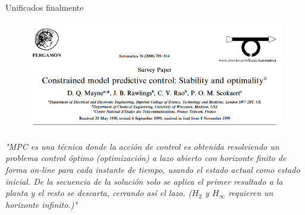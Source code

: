 \documentclass[8pt]{beamer}
\begin{document}
\begin{frame}[fragile]{Unificados finalmente}
	
	\begin{figure}[!ht]
		\centering
		\includegraphics[width=0.65\linewidth]{figures/MPC_Rawlings_Mayne_2000}	
	\end{figure}	
	\textit{"MPC es una técnica donde la acción de control es obtenida resolviendo un problema control óptimo (optimización) a lazo abierto con horizonte finito  de forma on-line para cada instante de tiempo, usando el estado actual como estado inicial. De la secuencia de la solución solo se aplica el primer resultado a la planta y el resto se descarta, cerrando así el lazo. ($H_2$ y $H_\infty$ requieren un horizonte infinito.)"}
	
	\begin{figure}[!ht]
		\centering
		\begin{adjustbox}{max totalsize={.75\textwidth}{1\textheight},center}
			
		\end{adjustbox}	
	\end{figure}
	
\end{frame}
\end{document}
